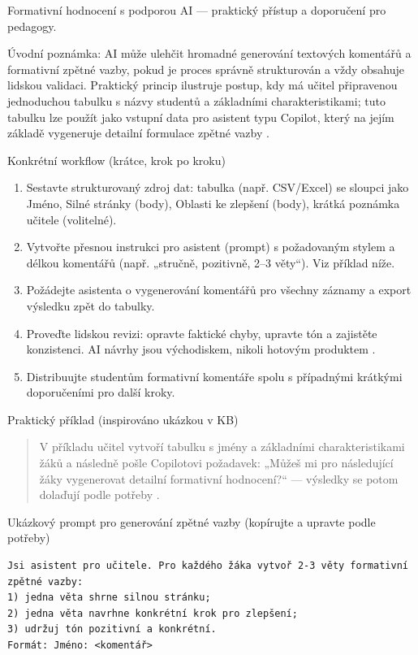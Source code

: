 Formativní hodnocení s podporou AI — praktický přístup a doporučení pro pedagogy.

Úvodní poznámka: AI může ulehčit hromadné generování textových komentářů a formativní zpětné vazby, pokud je proces správně strukturován a vždy obsahuje lidskou validaci. Praktický princip ilustruje postup, kdy má učitel připravenou jednoduchou tabulku s názvy studentů a základními charakteristikami; tuto tabulku lze použít jako vstupní data pro asistent typu Copilot, který na jejím základě vygeneruje detailní formulace zpětné vazby \cite{kb_ai_101_tipu_pdf_04e4a115_page_21_2}.

Konkrétní workflow (krátce, krok po kroku)
\begin{enumerate}
  \item Sestavte strukturovaný zdroj dat: tabulka (např. CSV/Excel) se sloupci jako Jméno, Silné stránky (body), Oblasti ke zlepšení (body), krátká poznámka učitele (volitelné).
  \item Vytvořte přesnou instrukci pro asistent (prompt) s požadovaným stylem a délkou komentářů (např. „stručně, pozitivně, 2–3 věty“). Viz příklad níže.
  \item Požádejte asistenta o vygenerování komentářů pro všechny záznamy a export výsledku zpět do tabulky.
  \item Proveďte lidskou revizi: opravte faktické chyby, upravte tón a zajistěte konzistenci. AI návrhy jsou východiskem, nikoli hotovým produktem \cite{kb_ai_101_tipu_pdf_04e4a115_page_21_2}.
  \item Distribuujte studentům formativní komentáře spolu s případnými krátkými doporučeními pro další kroky.
\end{enumerate}

Praktický příklad (inspirováno ukázkou v KB)
\begin{quote}
V příkladu učitel vytvoří tabulku s jmény a základními charakteristikami žáků a následně pošle Copilotovi požadavek: „Můžeš mi pro následující žáky vygenerovat detailní formativní hodnocení?“ — výsledky se potom dolaďují podle potřeby \cite{kb_ai_101_tipu_pdf_04e4a115_page_21_2}.
\end{quote}

Ukázkový prompt pro generování zpětné vazby (kopírujte a upravte podle potřeby)
\begin{verbatim}
Jsi asistent pro učitele. Pro každého žáka vytvoř 2-3 věty formativní zpětné vazby:
1) jedna věta shrne silnou stránku;
2) jedna věta navrhne konkrétní krok pro zlepšení;
3) udržuj tón pozitivní a konkrétní.
Formát: Jméno: <komentář>
\end{verbatim}

